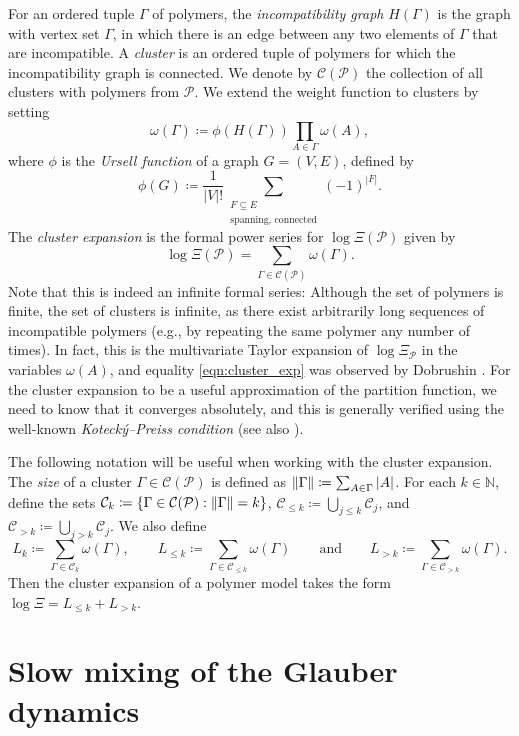 \documentclass[reqno,a4paper,11pt]{amsart}
\newcommand{\cC}{\mathcal{C}}
\newcommand{\cP}{\mathcal{P}}
\newcommand{\om}{\omega}
\newcommand{\Gam}{\Gamma}
\DeclarePairedDelimiter{\norm}{\lVert}{\rVert}
\begin{document}
For an ordered  tuple $\Gamma$ of polymers, the \emph{incompatibility graph} $H(\Gamma)$ is the graph with vertex set $\Gamma$, in which there is an edge between any two elements of $\Gamma$ that are incompatible.
A \textit{cluster} is an ordered tuple of polymers for which the incompatibility graph is connected. We denote by $\cC(\cP)$ the collection of all clusters with polymers from $\cP$. We extend the weight function to clusters by setting
$$\om(\Gam)\coloneqq\phi(H(\Gam))\prod_{A\in \Gam}\om(A),$$
where $\phi$ is the \textit{Ursell function} of a graph $G=(V, E)$, defined by
$$\phi(G)\coloneqq\frac{1}{|V|!}\sum_{\substack{F\subseteq E\\ \text{spanning, connected}}}(-1)^{|F|}.$$
The \textit{cluster expansion} is the formal power series for $\log\Xi(\cP)$ given by
\begin{equation}\label{eqn:cluster_exp}
    \log\Xi(\cP)=\sum_{\Gam\in\cC(\cP)}\om(\Gam).
\end{equation}
Note that this is indeed an infinite formal series: Although the set of polymers is finite, the set of clusters is infinite, as there exist arbitrarily long sequences of incompatible polymers (e.g., by repeating the same polymer any number of times). In fact, this is the multivariate Taylor expansion of $\log \Xi_\cP$ in the variables $\om(A)$, and equality \eqref{eqn:cluster_exp} was observed by Dobrushin \cite{dobrushin1996estimates}. For the cluster expansion to be a useful approximation of the partition function, we need to know that it converges absolutely, and this is generally verified using the well-known \textit{Koteck\'y--Preiss condition} \cite{kotecky1986cluster} (see also \cite{jenssen2020independent}). 

The following notation will be useful when working with the cluster expansion. The {\em size} of a cluster $\Gamma\in \cC(\cP)$ is defined as $\norm{\Gamma} \coloneqq \sum_{A \in \Gamma} |A|$. For each $k \in \mathbb{N}$, define the sets
$\cC_{k}\coloneqq \{\Gamma\in \cC(\cP): \norm{\Gamma} =k\}$, $\cC_{\leq k}\coloneqq \bigcup_{j\leq k}\cC_{j}$, and  $\cC_{> k} \coloneqq \bigcup_{j> k}\cC_{j}$. We also define  
\[
L_{k} \coloneqq \sum_{\Gamma \in \cC_{k}} \omega(\Gamma), \qquad L_{\leq k} \coloneqq \sum_{\Gamma \in \cC_{\leq k}} \omega(\Gamma) \qquad \text{and} \qquad L_{> k} \coloneqq \sum_{\Gamma \in \cC_{> k}} \omega(\Gamma).
\]
Then the cluster expansion of a polymer model takes the form $\log \Xi = L_{\le k} + L_{>k}$.

\section{Slow mixing of the Glauber dynamics} \label{sec:slowmixing}
\end{document}
